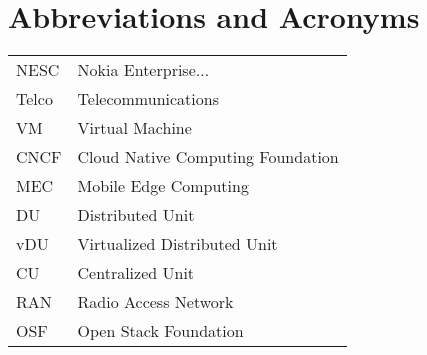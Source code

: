 \chapter*{Abbreviations and Acronyms}

\noindent
\begin{longtable}{@{}p{}p{}@{}}
NESC & Nokia Enterprise... \\
Telco & Telecommunications \\
VM & Virtual Machine \\
CNCF & Cloud Native Computing Foundation \\
MEC & Mobile Edge Computing \\
DU & Distributed Unit \\
vDU & Virtualized Distributed Unit \\
CU & Centralized Unit \\
RAN & Radio Access Network \\
OSF & Open Stack Foundation \\



\end{longtable}
